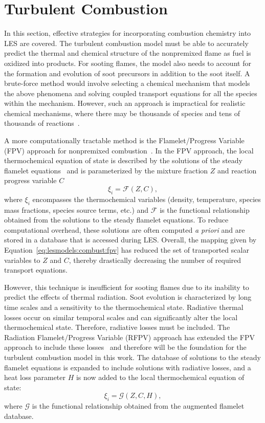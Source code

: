 \section{Turbulent Combustion}
\label{sec:lesmodels:combust}

In this section, effective strategies for incorporating combustion chemistry into LES are covered. The turbulent combustion model must be able to accurately predict the thermal and chemical structure of the nonpremixed flame as fuel is oxidized into products. For sooting flames, the model also needs to account for the formation and evolution of soot precursors in addition to the soot itself. A brute-force method would involve selecting a chemical mechanism that models the above phenomena and solving coupled transport equations for all the species within the mechanism. However, such an approach is impractical for realistic chemical mechanisms, where there may be thousands of species and tens of thousands of reactions~\cite{law2007}.

A more computationally tractable method is the Flamelet/Progress Variable (FPV) approach for nonpremixed combustion~\cite{pierce2004}. In the FPV approach, the local thermochemical equation of state is described by the solutions of the steady flamelet equations~\cite{peters1984} and is parameterized by the mixture fraction $Z$ and reaction progress variable $C$
\begin{equation}\label{eq:lesmodels:combust:fpv}
  \xi_i = \mathcal{F}(Z,C),
\end{equation}
where $\xi_i$ encompasses the thermochemical variables (density, temperature, species mass fractions, species source terms, etc.) and $\mathcal{F}$ is the functional relationship obtained from the solutions to the steady flamelet equations. To reduce computational overhead, these solutions are often computed \textit{a priori} and are stored in a database that is accessed during LES. Overall, the mapping given by Equation~\ref{eq:lesmodels:combust:fpv} has reduced the set of transported scalar variables to $Z$ and $C$, thereby drastically decreasing the number of required transport equations.

However, this technique is insufficient for sooting flames due to its inability to predict the effects of thermal radiation. Soot evolution is characterized by long time scales and a sensitivity to the thermochemical state. Radiative thermal losses occur on similar temporal scales and can significantly alter the local thermochemical state. Therefore, radiative losses must be included. The Radiation Flamelet/Progress Variable (RFPV) approach has extended the FPV approach to include these losses~\cite{ihme2008} and therefore will be the foundation for the turbulent combustion model in this work. The database of solutions to the steady flamelet equations is expanded to include solutions with radiative losses, and a heat loss parameter $H$ is now added to the local thermochemical equation of state:
\begin{equation}\label{eq:lesmodels:combust:rfpv}
  \xi_i = \mathcal{G}(Z, C, H),
\end{equation}
where $\mathcal{G}$ is the functional relationship obtained from the augmented flamelet database.


